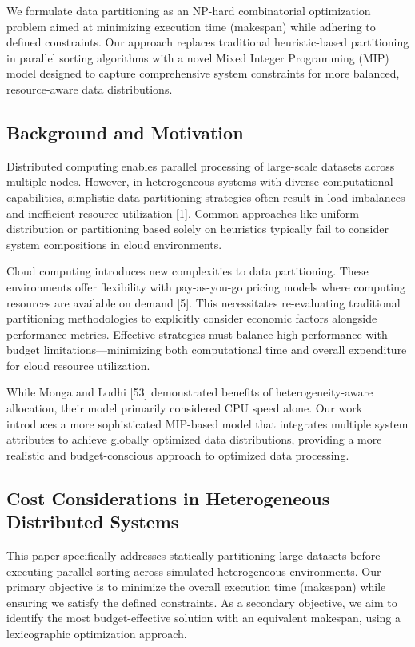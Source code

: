 \documentclass[]{interact}
\theoremstyle{plain}
\theoremstyle{definition}
\theoremstyle{remark}
\begin{document}
We formulate data partitioning as an NP-hard combinatorial optimization problem aimed at minimizing execution time (makespan) while adhering to defined constraints. Our approach replaces traditional heuristic-based partitioning in parallel sorting algorithms with a novel Mixed Integer Programming (MIP) model designed to capture comprehensive system constraints for more balanced, resource-aware data distributions.

\subsection{Background and Motivation}

Distributed computing enables parallel processing of large-scale datasets across multiple nodes. However, in heterogeneous systems with diverse computational capabilities, simplistic data partitioning strategies often result in load imbalances and inefficient resource utilization [1]. Common approaches like uniform distribution or partitioning based solely on heuristics typically fail to consider system compositions in cloud environments.

Cloud computing introduces new complexities to data partitioning. These environments offer flexibility with pay-as-you-go pricing models where computing resources are available on demand [5]. This necessitates re-evaluating traditional partitioning methodologies to explicitly consider economic factors alongside performance metrics. Effective strategies must balance high performance with budget limitations—minimizing both computational time and overall expenditure for cloud resource utilization. 

While Monga and Lodhi [53] demonstrated benefits of heterogeneity-aware allocation, their model primarily considered CPU speed alone. Our work introduces a more sophisticated MIP-based model that integrates multiple system attributes to achieve globally optimized data distributions, providing a more realistic and budget-conscious approach to optimized data processing.


\subsection{Cost Considerations in Heterogeneous Distributed Systems}

This paper specifically addresses statically partitioning large datasets before executing parallel sorting across simulated heterogeneous environments. Our primary objective is to minimize the overall execution time (makespan) while ensuring we satisfy the defined constraints. As a secondary objective, we aim to identify the most budget-effective solution with an equivalent makespan, using a lexicographic optimization approach. 
\end{document}
